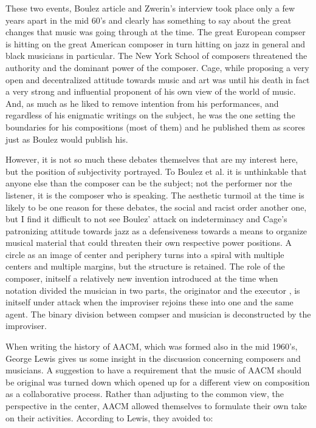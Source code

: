 \documentclass[a4paper]{article}
\begin{document}
These two events, Boulez article and Zwerin's interview took place only a few years apart in the mid 60's and clearly has something to say about the great changes that music was going through at the time. The great European compser is hitting on the great American composer in turn hitting on jazz in general and black musicians in particular. The New York School of composers threatened the authority and the dominant power of the composer. Cage, while proposing a very open and decentralized attitude towards music and art was until his death in fact a very strong and influential proponent of his own view of the world of music. And, as much as he liked to remove intention from his performances, and regardless of his enigmatic writings on the subject, he was the one setting the boundaries for his compositions (most of them) and he published them as scores just as Boulez would publish his. 

However, it is not so much these debates themselves that are my interest here, but the position of subjectivity portrayed. To Boulez et al. it is unthinkable that anyone else than the composer can be the subject; not the performer nor the listener, it is the composer who is speaking. The aesthetic turmoil at the time is likely to be one reason for these debates, the social and racist order another one, but I find it difficult to not see Boulez' attack on indeterminacy and Cage's patronizing attitude towards jazz as a defensiveness towards a means to organize musical material that could threaten their own respective power positions. A circle as an image of center and periphery turns into a spiral with multiple centers and multiple margins, but the structure is retained. The role of the composer, initself a relatively new invention introduced at the time when notation divided the musician in two parts, the originator and the executor \citep{wis96,frisk-ost06-2}, is initself under attack when the improviser rejoins these into one and the same agent. The binary division between compser and musician is deconstructed by the improviser.

When writing the history of AACM, which was formed also in the mid 1960's, George Lewis gives us some insight in the discussion concerning composers and musicians. A suggestion to have a requirement that the music of AACM should be original was turned down which opened up for a different view on composition as a collaborative process. Rather than adjusting to the common view, the perspective in the center, AACM allowed themselves to formulate their own take on their activities. According to Lewis, they avoided to:
\end{document}
